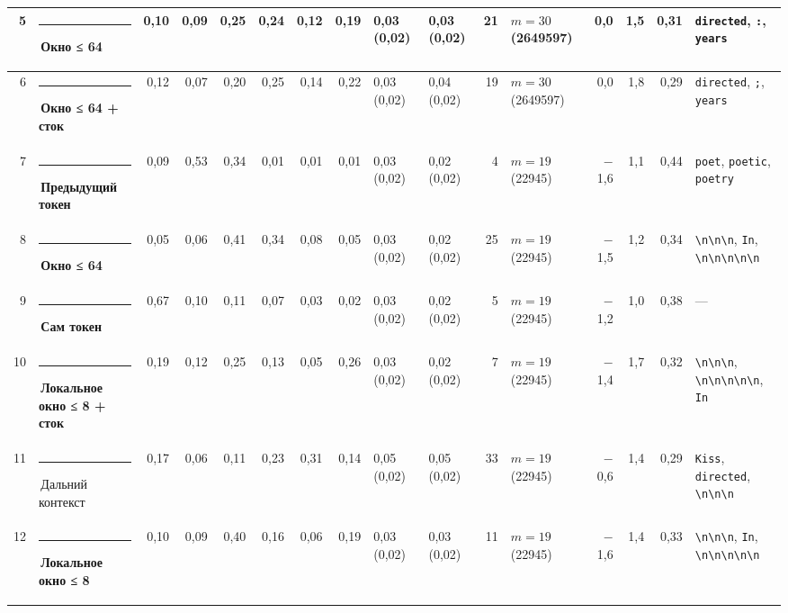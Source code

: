 \documentclass[10pt]{article}
\begin{document}
\begin{minipage}{\linewidth}
\begin{center}
{\begin{tabular}{|r|l|r|r|r|r|r|r|l|l|r|l|r|r|r|l|}
5 & \textcolor[HTML]{EDA100}{\rule{0.62em}{0.62em}}\,\textbf{Окно ≤ 64} & 0,10 & 0,09 & 0,25 & 0,24 & 0,12 & 0,19 & 0,03 (0,02) & 0,03 (0,02) & 21 & $m{=}30$ (2649597) & 0,0 & 1,5 & 0,31 & \texttt{\textvisiblespace{}directed}, \texttt{\textvisiblespace{}:}, \texttt{\textvisiblespace{}years} \\ \hline
6 & \textcolor[HTML]{EDA100}{\rule{0.62em}{0.62em}}\,\textbf{Окно ≤ 64 + сток} & 0,12 & 0,07 & 0,20 & 0,25 & 0,14 & 0,22 & 0,03 (0,02) & 0,04 (0,02) & 19 & $m{=}30$ (2649597) & 0,0 & 1,8 & 0,29 & \texttt{\textvisiblespace{}directed}, \texttt{\textvisiblespace{};}, \texttt{\textvisiblespace{}years} \\ \hline
7 & \textcolor[HTML]{2A78D6}{\rule{0.62em}{0.62em}}\,\textbf{Предыдущий токен} & 0,09 & 0,53 & 0,34 & 0,01 & 0,01 & 0,01 & 0,03 (0,02) & 0,02 (0,02) & 4 & $m{=}19$ (22945) & $-$1,6 & 1,1 & 0,44 & \texttt{\textvisiblespace{}poet}, \texttt{\textvisiblespace{}poetic}, \texttt{\textvisiblespace{}poetry} \\ \hline
8 & \textcolor[HTML]{EDA100}{\rule{0.62em}{0.62em}}\,\textbf{Окно ≤ 64} & 0,05 & 0,06 & 0,41 & 0,34 & 0,08 & 0,05 & 0,03 (0,02) & 0,02 (0,02) & 25 & $m{=}19$ (22945) & $-$1,5 & 1,2 & 0,34 & \texttt{\textvisiblespace{}\textbackslash{}n\textbackslash{}n\textbackslash{}n}, \texttt{\textvisiblespace{}In}, \texttt{\textbackslash{}n\textbackslash{}n\textbackslash{}n\textbackslash{}n\textbackslash{}n} \\ \hline
9 & \textcolor[HTML]{2A78D6}{\rule{0.62em}{0.62em}}\,\textbf{Сам токен} & 0,67 & 0,10 & 0,11 & 0,07 & 0,03 & 0,02 & 0,03 (0,02) & 0,02 (0,02) & 5 & $m{=}19$ (22945) & $-$1,2 & 1,0 & 0,38 & — \\ \hline
10 & \textcolor[HTML]{1BAF7A}{\rule{0.62em}{0.62em}}\,\textbf{Локальное окно ≤ 8 + сток} & 0,19 & 0,12 & 0,25 & 0,13 & 0,05 & 0,26 & 0,03 (0,02) & 0,02 (0,02) & 7 & $m{=}19$ (22945) & $-$1,4 & 1,7 & 0,32 & \texttt{\textvisiblespace{}\textbackslash{}n\textbackslash{}n\textbackslash{}n}, \texttt{\textbackslash{}n\textbackslash{}n\textbackslash{}n\textbackslash{}n\textbackslash{}n}, \texttt{\textvisiblespace{}In} \\ \hline
11 & \textcolor[HTML]{C3C2B7}{\rule{0.62em}{0.62em}}\,Дальний контекст & 0,17 & 0,06 & 0,11 & 0,23 & 0,31 & 0,14 & 0,05 (0,02) & 0,05 (0,02) & 33 & $m{=}19$ (22945) & $-$0,6 & 1,4 & 0,29 & \texttt{\textvisiblespace{}Kiss}, \texttt{\textvisiblespace{}directed}, \texttt{\textvisiblespace{}\textbackslash{}n\textbackslash{}n\textbackslash{}n} \\ \hline
12 & \textcolor[HTML]{1BAF7A}{\rule{0.62em}{0.62em}}\,\textbf{Локальное окно ≤ 8} & 0,10 & 0,09 & 0,40 & 0,16 & 0,06 & 0,19 & 0,03 (0,02) & 0,03 (0,02) & 11 & $m{=}19$ (22945) & $-$1,6 & 1,4 & 0,33 & \texttt{\textvisiblespace{}\textbackslash{}n\textbackslash{}n\textbackslash{}n}, \texttt{\textvisiblespace{}In}, \texttt{\textbackslash{}n\textbackslash{}n\textbackslash{}n\textbackslash{}n\textbackslash{}n} \\ \hline

\end{tabular}}
\end{center}
\end{minipage}
\end{document}
